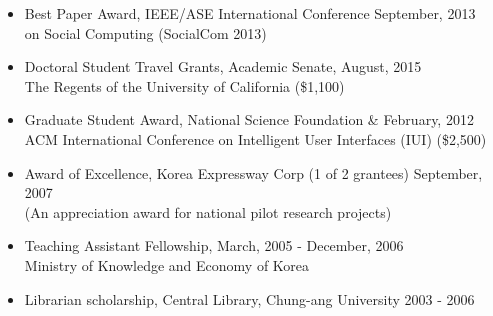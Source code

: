 \documentclass[10pt]{article}
\newenvironment{innerlist}[1][\enskip\textbullet]%
        {\begin{itemize}[#1,leftmargin=*,parsep=0pt,itemsep=0pt,topsep=0pt,partopsep=0pt]}
        {\end{itemize}}
\newcommand{\halfblankline}{\quad\vspace{-0.5\baselineskip}\pagebreak[3]}
\begin{document}
\begin{innerlist}
   \item[--] Best Paper Award, IEEE/ASE International Conference \hfill September, 2013\\
   on Social Computing (SocialCom 2013) 
   
   \item[--] Doctoral Student Travel Grants, Academic Senate, \hfill August, 2015\\
   The Regents of the University of California (\$1,100)
   
   \item[--] Graduate Student Award, National Science Foundation \& \hfill February, 2012\\
   ACM International Conference on Intelligent User Interfaces (IUI) (\$2,500)
   
   
   \item[--] Award of Excellence, Korea Expressway Corp (1 of 2 grantees) \hfill September, 2007\\
   (An appreciation award for national pilot research projects)
   
   
   \item[--] Teaching Assistant Fellowship, \hfill March, 2005 - December, 2006\\
   Ministry of Knowledge and Economy of Korea
   
   
   \item[--] Librarian scholarship, Central Library, Chung-ang University
   \hfill 2003 - 2006
\end{innerlist}


\end{document}
